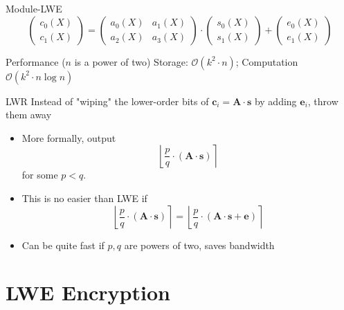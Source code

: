 \documentclass[xcolor=table,10pt,aspectratio=169]{beamer}
\renewcommand{\vec}[1]{\ensuremath{\mathbf{#1}}\xspace}
\newcommand{\mat}[1]{\ensuremath{\vec{#1}}\xspace}
\begin{document}
\begin{frame}[label={sec:orga25f397}]{Module-LWE}
\[
\begin{pmatrix} c_{0}(X) \\ c_{1}(X) \end{pmatrix} =
\begin{pmatrix} a_{0}(X) & a_{1}(X) \\ a_{2}(X) & a_{3}(X) \end{pmatrix} \cdot
\begin{pmatrix} s_{0}(X) \\ s_{1}(X) \end{pmatrix} +
\begin{pmatrix} e_{0}(X) \\ e_{1}(X) \end{pmatrix}
\]

\begin{block}{Performance (\(n\) is a power of two)}
Storage: \(\mathcal{O}(k^{2} \cdot n)\); Computation \(\mathcal{O}(k^{2} \cdot n \log n)\)
\end{block}
\end{frame}

\begin{frame}[label={sec:org521db13}]{LWR}
Instead of "wiping" the lower-order bits of \(\vec{c}_{i} = \mat{A} \cdot \vec{s}\) by adding \(\vec{e}_{i}\), throw them away
\begin{itemize}
\item More formally, output \[ \left\lfloor{\frac{p}{q} \cdot  (\mat{A} \cdot \vec{s})} \right\rceil \]  for some \(p < q\).
\item This is no easier than LWE if  \[ \left\lfloor{\frac{p}{q} \cdot  (\mat{A} \cdot \vec{s})} \right\rceil =    \left\lfloor{\frac{p}{q} \cdot  (\mat{A} \cdot \vec{s} + \vec{e})} \right\rceil  \]
\item Can be quite fast if \(p,q\) are powers of two, saves bandwidth
\end{itemize}

\end{frame}

\section{LWE Encryption}
\label{sec:orgefbe771}
\end{document}
